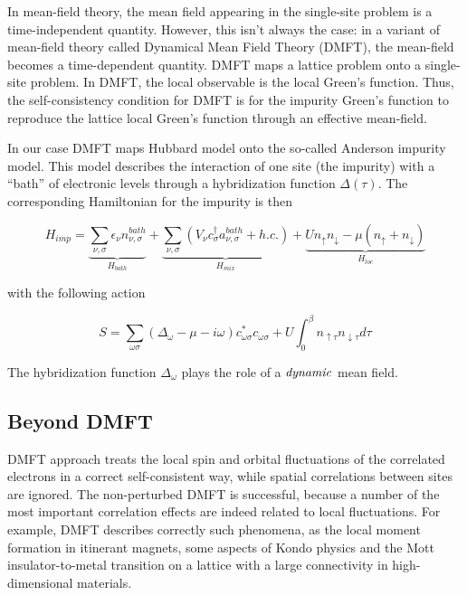 In mean-field theory, the mean field appearing in the single-site problem is a time-independent quantity.
However, this isn't always the case: in a variant of mean-field theory called Dynamical Mean Field Theory (DMFT), the mean-field becomes a time-dependent quantity.
DMFT maps a lattice problem onto a single-site problem. In DMFT, the local observable is the local Green's function.
Thus, the self-consistency condition for DMFT is for the impurity Green's function to reproduce the lattice local Green's function through an effective mean-field.

In our case DMFT maps Hubbard model onto the so-called Anderson impurity model.
This model describes the interaction of one site (the impurity) with a ``bath'' of electronic levels through a hybridization function $\Delta(\tau)$.
The corresponding Hamiltonian for the impurity is then

\begin{equation} H_{imp} = \underbrace{\sum_{\nu,\sigma}\epsilon_\nu n_{\nu,\sigma}^{bath}}_{H_{bath}} + 
	     \underbrace{\sum_{\nu,\sigma}\left(V_{\nu}c_{\sigma}^{\dagger}a_{\nu,\sigma}^{bath}+h.c.\right)}_{H_{mix}}+
	     \underbrace{U n_{\uparrow} n_{\downarrow}-\mu \left(n_{\uparrow}+n_{\downarrow}\right)}_{H_{loc}}
\end{equation}

with the following action

\begin{equation} S = \sum_{\omega \sigma}(\Delta_\omega-\mu-i\omega)c_{\omega\sigma}^* c_{\omega\sigma} + U\int_0^\beta n_{\uparrow\tau}n_{\downarrow\tau} d\tau \end{equation}

The hybridization function $\Delta_\omega$ plays the role of a $\it{dynamic}$ mean field.

\subsection{Beyond DMFT}
DMFT approach treats the local spin and orbital fluctuations of the correlated electrons in a correct self-consistent way,
 while spatial correlations between sites are ignored.
The non-perturbed DMFT is successful, because a number of the most important correlation effects are indeed related to local fluctuations.
For example, DMFT describes correctly such phenomena, as the local moment formation in itinerant magnets, some aspects of Kondo physics
 and the Mott insulator-to-metal transition on a lattice with a large connectivity in high-dimensional materials.

